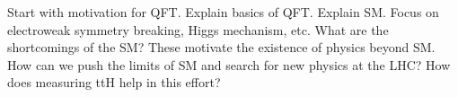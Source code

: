 Start with motivation for QFT.
Explain basics of QFT.
Explain SM.
Focus on electroweak symmetry breaking, Higgs mechanism, etc.
What are the shortcomings of the SM?
These motivate the existence of physics beyond SM.
How can we push the limits of SM and search for new physics at the LHC?
How does measuring ttH help in this effort?
